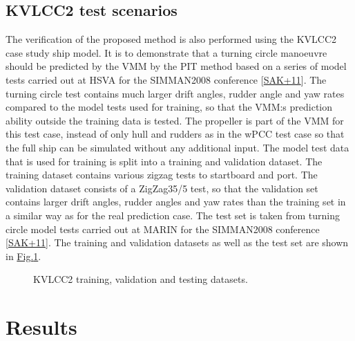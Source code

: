 \documentclass[review]{elsarticle}
\begin{document}
\subsection{KVLCC2 test scenarios}
\label{\detokenize{05.01_case_studies:kvlcc2-test-scenarios}}
\sphinxAtStartPar
The verification of the proposed method is also performed using the KVLCC2 case study ship model. It is to demonstrate that a turning circle manoeuvre should be predicted by the VMM by the PIT method based on a series of model tests carried out at HSVA for the SIMMAN2008 conference {[}\hyperlink{cite.bibligraphy:id79}{SAK+11}{]}. The turning circle test contains much larger drift angles, rudder angle and yaw rates compared to the model tests used for training, so that
the VMM:s prediction ability outside the training data is tested.
The propeller is part of the VMM for this test case, instead of only hull and rudders as in the wPCC test case so that the full ship can be simulated without any additional input.
The model test data that is used for training is split into a training and validation dataset. The training dataset contains various zigzag tests to startboard and port. The validation dataset consists of a ZigZag35/5 test, so that the validation set contains larger drift angles, rudder angles and yaw rates than the training set in a similar way as for the real prediction case. The test set is taken from turning circle model tests carried out at MARIN for the SIMMAN2008 conference {[}\hyperlink{cite.bibligraphy:id79}{SAK+11}{]}. The training and validation datasets as well as the test set are shown in \hyperref[\detokenize{05.01_case_studies:fig-kvlcc2-traintest}]{Fig.\@ \ref{\detokenize{05.01_case_studies:fig-kvlcc2-traintest}}}.

\begin{figure}[H]
\centering
\capstart

\noindent{}
\caption{KVLCC2 training, validation and testing datasets.}\label{\detokenize{05.01_case_studies:fig-kvlcc2-traintest}}\end{figure}


\section{Results}
\label{\detokenize{06.01_results:results}}\label{\detokenize{06.01_results:id1}}\label{\detokenize{06.01_results::doc}}
\end{document}
